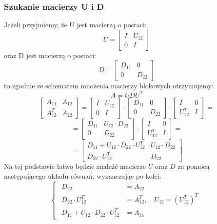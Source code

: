 \documentclass{article}
\begin{document}
     \subsubsection*{Szukanie macierzy U i D}
Jeżeli przyjmiemy, że U jest macierzą o postaci:
\[
    U=\begin{bmatrix}
        I & U_{12}\\
        0 & I
    \end{bmatrix}
\]
oraz D jest macierzą o postaci:
\[
    D=\begin{bmatrix}
        D_{11} & 0\\
        0 & D_{22}
    \end{bmatrix}
\]
to zgodnie ze schematem mnożenia macierzy blokowych otrzymujemy:
\[
    A = UDU^T
\]
\vspace{5pt}
\[
    \begin{bmatrix}
        A_{11} & A_{12}\\
        A_{12}^T & A_{22}
    \end{bmatrix}
    =
    \begin{bmatrix}
        I & U_{12}\\
        0 & I
    \end{bmatrix}
    \cdot
    \begin{bmatrix}
        D_{11} & 0\\
        0 & D_{22}
    \end{bmatrix}
    \cdot
    \begin{bmatrix}
        I & 0\\
        U_{12}^T & I
    \end{bmatrix}
    =
\]
\[
=
    \begin{bmatrix}
        D_{11} & U_{12} \cdot D_{22}\\
        0 & D_{22}
    \end{bmatrix}
    \cdot
    \begin{bmatrix}
        I & 0\\
        U_{12}^T & I
    \end{bmatrix}
    =
\]
\[
    =
    \begin{bmatrix}
        D_{11} + U_{12} \cdot D_{22} \cdot U_{12}^T & U_{12} \cdot D_{22}\\
        D_{22} \cdot U_{12}^T & D_{22}
    \end{bmatrix}
\]
Na tej podstawie łatwo będzie znaleźć macierze \(U\) oraz \(D\) za pomocą następującego układu równań, wyznaczając po kolei:
\[
    \begin{cases}
        \begin{aligned}
            D_{22} &= A_{22} \\
            D_{22} \cdot U_{12}^T &= A_{12}^T, \quad U_{12} = (U_{12}^T)^T\\
            D_{11} + U_{12} \cdot D_{22} \cdot U_{12}^T &= A_{11}
        \end{aligned}
    \end{cases}
\]
\newpage
\end{document}
